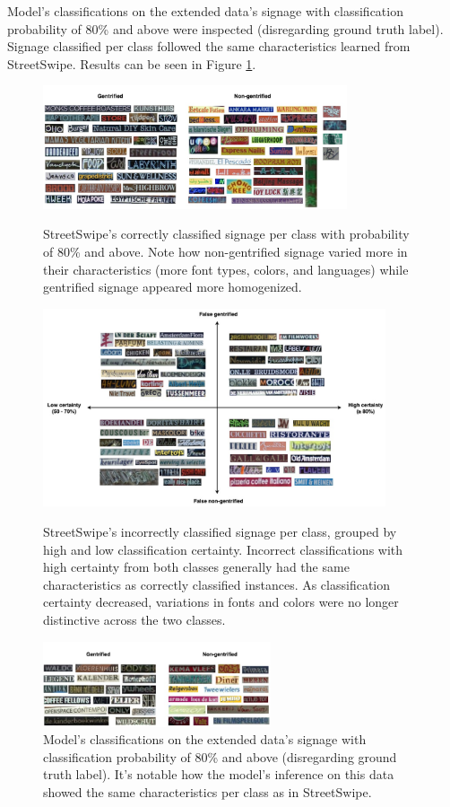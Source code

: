 Model's classifications on the extended data's signage with classification probability of 80\% and above were inspected (disregarding ground truth label). Signage classified per class followed the same characteristics learned from StreetSwipe. Results can be seen in Figure \ref{fig:output_vis_pano}.


\begin{figure}[]
    \centering
    \includegraphics[width=0.8\textwidth]{media/results/output_vis-SS_correct1.jpg}
        \caption{StreetSwipe's correctly classified signage per class with probability of 80\% and above. Note how non-gentrified signage varied more in their characteristics (more font types, colors, and languages) while gentrified signage appeared more homogenized.}
        \label{fig:output_vis}
    \includegraphics[width=0.9\textwidth]{media/results/output_vis-SS_incorrect.jpg}
        \caption{StreetSwipe's incorrectly classified signage per class, grouped by high and low classification certainty. Incorrect classifications with high certainty from both classes generally had the same characteristics as correctly classified instances. As classification certainty decreased, variations in fonts and colors were no longer distinctive across the two classes.}
        \label{fig:output_vis_SS_incorrect}
    \includegraphics[width=0.6\textwidth]{media/results/output_vis-pano1.jpg}
        \caption{Model's classifications on the extended data's signage with classification probability of 80\% and above (disregarding ground truth label). It's notable how the model's inference on this data showed the same characteristics per class as in StreetSwipe.}
        \label{fig:output_vis_pano}
\end{figure}

